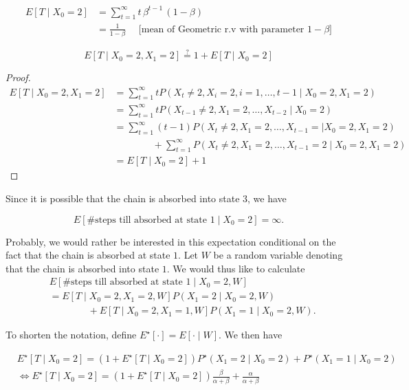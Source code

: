 \documentclass{article}
\theoremstyle{definition}
\begin{document}
\begin{align*}
E\left[T \mid X_0 = 2 \right] 
&= \sum_{t=1}^\infty t \,  \beta^{t-1}\,(1-\beta) \\
&= \frac{1}{1-\beta} \quad \text{ [mean of Geometric r.v with parameter $1-\beta$]}
\end{align*}

$$
E \left[ T \mid X_0 = 2, X_1 = 2 \right] \overset{?}{=} 1 + E \left[ T \mid X_0 = 2 \right]
$$

\begin{proof}

\begin{align*}
E \left[ T \mid X_0 = 2, X_1 = 2 \right] 
&= \sum_{t=1}^\infty t P \left( X_t \ne 2, X_i = 2, i=1,\ldots,t-1 \mid X_0 = 2, X_1 = 2 \right) \\
&= \sum_{t=1}^\infty t P \left( X_{t-1} \ne 2, X_1 = 2, \ldots, X_{t-2} \mid X_0 = 2 \right) \\
&= \sum_{t=1}^\infty (t-1) P \left( X_t \ne 2,  X_1 = 2, \ldots, X_{t-1} = \mid X_0 = 2, X_1 = 2 \right) \\
&\qquad \qquad + \sum_{t=1}^\infty P \left( X_t \ne 2, X_1 = 2, \ldots, X_{t-1} = 2 \mid X_0 = 2, X_1 = 2 \right) \\ 
&= E\left[T \mid X_0 = 2 \right] +1
\end{align*}

\end{proof}

Since it is possible that the chain is absorbed into state $3$, we have

$$
E \left[ \text{\# steps till absorbed at state 1} \mid X_0 = 2 \right] = \infty.
$$

Probably, we would rather be interested in this expectation conditional on the fact that the chain is absorbed at state $1$. Let $W$ be a random variable denoting that the chain is absorbed into state $1$. We would thus like to calculate 
\begin{align*}
&E \left[ \text{\# steps till absorbed at state 1} \mid X_0 = 2, W \right] \\
&= E \left[ T \mid X_0 = 2, X_1 = 2, W \right] P(X_1 = 2 \mid X_0 = 2, W) \\
&\qquad \qquad + E \left[ T \mid X_0 = 2, X_1 = 1, W \right] P(X_1 = 1 \mid X_0 = 2, W).
\end{align*}

To shorten the notation, define $E^\star[\cdot] = E[\cdot \mid W]$. We then have

\begin{align*}
&E^\star \left[ T \mid X_0 =2 \right] = (1 + E^\star \left[ T \mid X_0 = 2 \right]) P^\star (X_1 =2 \mid X_0 = 2) + P^\star (X_1 = 1 \mid X_0 =2) \\
&\iff E^\star \left[ T \mid X_0 =2 \right] = (1 + E^\star \left[ T \mid X_0 = 2 \right]) \frac{\beta}{\alpha+\beta} + \frac{\alpha}{\alpha+\beta}
\end{align*}
\end{document}

